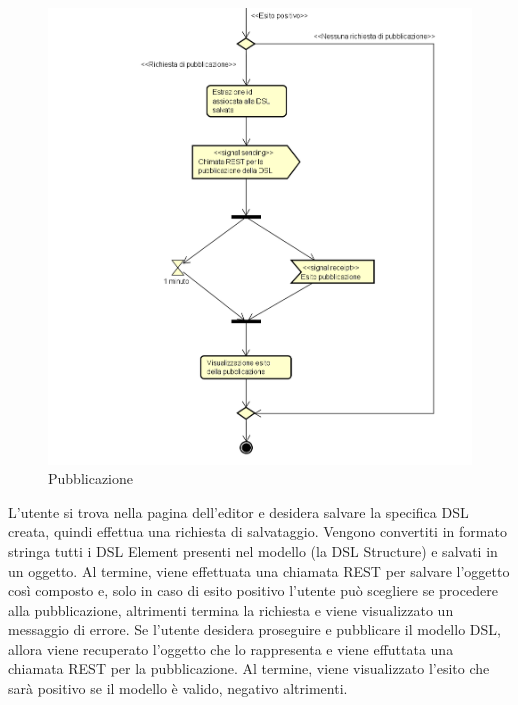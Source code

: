     \begin{figure}[H]
      \centering
      \includegraphics[width=.7\textwidth]{res/img/pubblicazione.png}
      \caption{Pubblicazione}
      \label{fig:pubblicazione}
    \end{figure}
    L'utente si trova nella pagina dell'editor e desidera salvare la specifica DSL creata, quindi effettua una richiesta di salvataggio. Vengono convertiti in formato stringa tutti i DSL Element presenti nel modello (la DSL Structure) e salvati in un oggetto. Al termine, viene effettuata una chiamata REST per salvare l'oggetto così composto e, solo in caso di esito positivo l'utente può scegliere se procedere alla pubblicazione, altrimenti termina la richiesta e viene visualizzato un messaggio di errore.
    Se l'utente desidera proseguire e pubblicare il modello DSL, allora viene recuperato l'oggetto che lo rappresenta e viene effuttata una chiamata REST per la pubblicazione. Al termine, viene visualizzato l'esito che sarà positivo se il modello è valido, negativo altrimenti.

